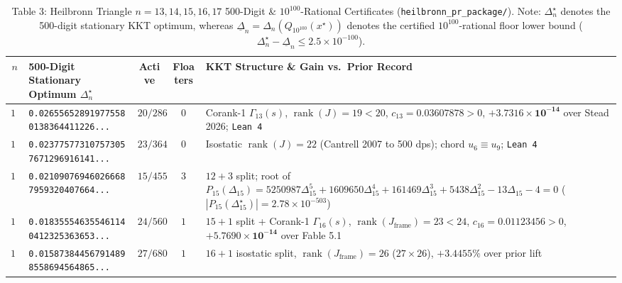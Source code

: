 \documentclass[11pt,a4paper]{article}
\begin{document}
\begin{table}[ht!]
\centering
\caption{Table 3: Heilbronn Triangle $n = 13, 14, 15, 16, 17$ 500-Digit \& $10^{100}$-Rational Certificates (\texttt{heilbronn\_pr\_package/}). Note: $\Delta_n^\star$ denotes the 500-digit stationary KKT optimum, whereas $\underline{\Delta}_n = \Delta_n(Q_{10^{100}}(x^\star))$ denotes the certified $10^{100}$-rational floor lower bound ($\Delta_n^\star - \underline{\Delta}_n \le 2.5\times 10^{-100}$).}
\label{tab:heilbronn}
\footnotesize
\begin{tabular}{cp{4.8cm}ccp{5.4cm}}
\toprule
$n$ & \textbf{500-Digit Stationary Optimum $\Delta_n^\star$} & \textbf{Active} & \textbf{Floaters} & \textbf{KKT Structure \& Gain vs.\ Prior Record} \\
\midrule
$13$ & \texttt{0.026556528919775580138364411226...} & $20/286$ & $0$ & Corank-1 $\Gamma_{13}(s)$, $\operatorname{rank}(J)=19<20$, $c_{13}=0.03607878>0$, $\mathbf{+3.7316\times 10^{-14}}$ over Stead 2026; \texttt{Lean 4} \\
$14$ & \texttt{0.023775773107573057671296916141...} & $23/364$ & $0$ & Isostatic $\operatorname{rank}(J)=22$ (Cantrell 2007 to 500 dps); chord $u_6 \equiv u_9$; \texttt{Lean 4} \\
$15$ & \texttt{0.021090769460266687959320407664...} & $15/455$ & $3$ & $12+3$ split; root of $P_{15}(\Delta_{15}) = 5250987\Delta_{15}^5 + 1609650\Delta_{15}^4 + 161469\Delta_{15}^3 + 5438\Delta_{15}^2 - 13\Delta_{15} - 4 = 0$ ($|P_{15}(\Delta_{15}^\star)| = 2.78\times 10^{-503}$) \\
$16$ & \texttt{0.018355546355461140412325363653...} & $24/560$ & $1$ & $15+1$ split + Corank-1 $\Gamma_{16}(s)$, $\operatorname{rank}(J_{\text{frame}})=23<24$, $c_{16}=0.01123456>0$, $\mathbf{+5.7690\times 10^{-14}}$ over Fable 5.1 \\
$17$ & \texttt{0.015873844567914898558694564865...} & $27/680$ & $1$ & $16+1$ isostatic split, $\operatorname{rank}(J_{\text{frame}})=26$ ($27\times 26$), $\mathbf{+3.4455\%}$ over prior lift \\
\bottomrule
\end{tabular}
\end{table}
\end{document}
